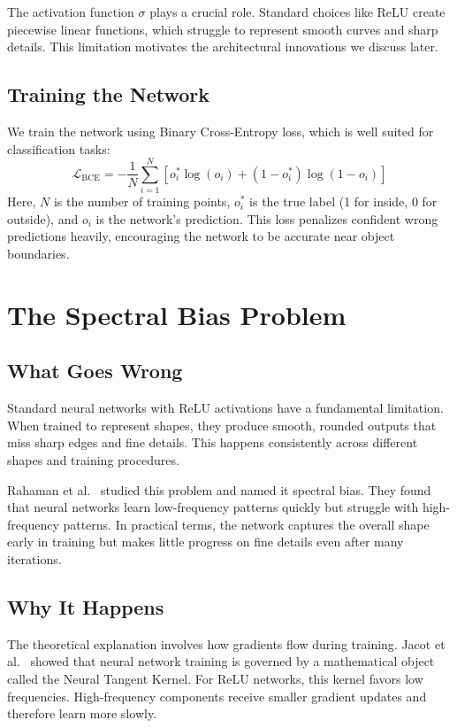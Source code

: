 The activation function $\sigma$ plays a crucial role. Standard choices like ReLU create piecewise linear functions, which struggle to represent smooth curves and sharp details. This limitation motivates the architectural innovations we discuss later.

\subsection{Training the Network}

We train the network using Binary Cross-Entropy loss, which is well suited for classification tasks:
\begin{equation}
    \mathcal{L}_{\text{BCE}} = -\frac{1}{N} \sum_{i=1}^{N} \left[ o_i^* \log(o_i) + (1 - o_i^*) \log(1 - o_i) \right]
\end{equation}
Here, $N$ is the number of training points, $o_i^*$ is the true label (1 for inside, 0 for outside), and $o_i$ is the network's prediction. This loss penalizes confident wrong predictions heavily, encouraging the network to be accurate near object boundaries.

\section{The Spectral Bias Problem}

\subsection{What Goes Wrong}

Standard neural networks with ReLU activations have a fundamental limitation. When trained to represent shapes, they produce smooth, rounded outputs that miss sharp edges and fine details. This happens consistently across different shapes and training procedures.

Rahaman et al.~\cite{rahaman2019spectral} studied this problem and named it spectral bias. They found that neural networks learn low-frequency patterns quickly but struggle with high-frequency patterns. In practical terms, the network captures the overall shape early in training but makes little progress on fine details even after many iterations.

\subsection{Why It Happens}

The theoretical explanation involves how gradients flow during training. Jacot et al.~\cite{jacot2018ntk} showed that neural network training is governed by a mathematical object called the Neural Tangent Kernel. For ReLU networks, this kernel favors low frequencies. High-frequency components receive smaller gradient updates and therefore learn more slowly.

